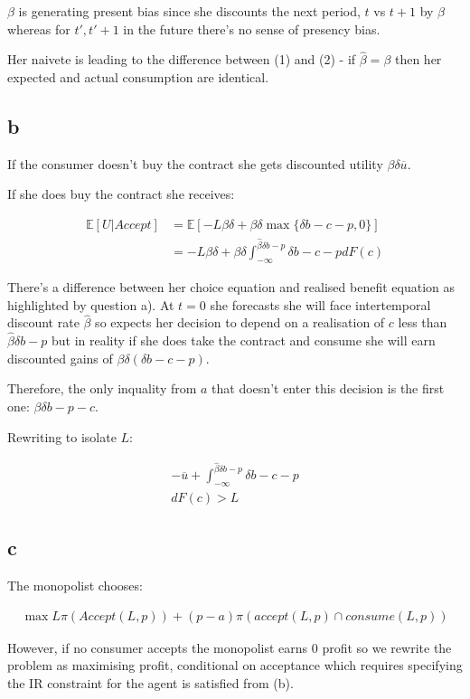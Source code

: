 \documentclass{article}
\begin{document}
$\beta$ is generating present bias since she discounts the next period, $t$ vs 
$t+1$ by $\beta$ whereas for $t', t'+1$ in the future there's no sense of 
presency bias.


Her naivete is leading to the difference between (1) and (2) - if $\hat{\beta} = \beta$
then her expected and actual consumption are identical.


\subsection*{b}


If the consumer doesn't buy the contract she gets discounted utility $\beta \delta \overline{u}$.

If she does buy the contract she receives:

\begin{align*}
    \mathbb{E}[U | \textit{Accept}] &= \mathbb{E}\left[ 
        -L\beta \delta + \beta \delta \max\{\delta b - c - p, 0\} 
    \right] \\
    &= -L \beta \delta + \beta \delta \int^{\hat{\beta}\delta b - p}_{-\infty} \delta b - c - p dF(c)
\end{align*}


There's a difference between her choice equation and realised benefit equation as 
highlighted by question a). At $t=0$ she forecasts she will face intertemporal 
discount rate $\hat{\beta}$ so expects her decision to depend on a realisation of 
$c$ less than $\hat{\beta}\delta b - p$ but in reality if she does take the 
contract and consume she will earn discounted gains of $\beta \delta (\delta b - c - p)$. 



Therefore, the only inquality from $a$ that doesn't enter this decision is the 
first one: $\beta \delta b - p - c$.


Rewriting to isolate $L$:

\begin{align*}
    - \overline{u} + \int^{\hat{\beta}\delta b - p}_{-\infty} \delta b - c - p \\ dF(c) > L
\end{align*}

\subsection*{c}


The monopolist chooses:

\begin{align*}
    \max L \pi(\textit{Accept}(L, p)) + (p - a) \pi(\textit{accept}(L, p) \cap \textit{consume}(L, p))
\end{align*}


However, if no consumer accepts the monopolist earns 0 profit so we rewrite the 
problem as maximising profit, conditional on acceptance which requires 
specifying the IR constraint for the agent is satisfied from (b).
\end{document}
